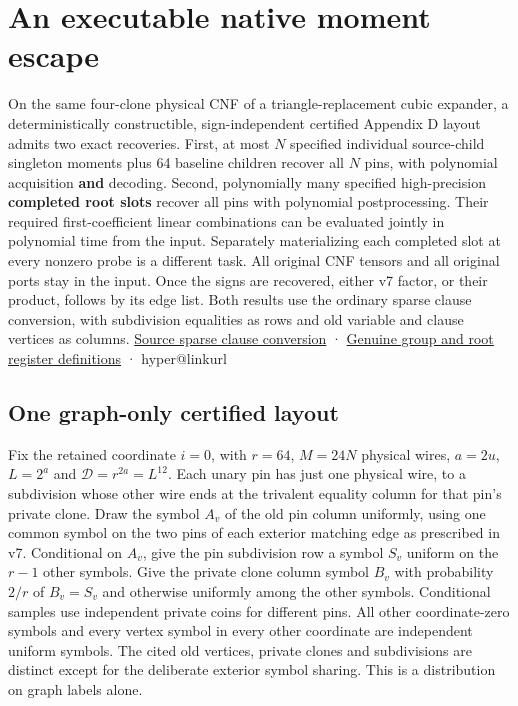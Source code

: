 \documentclass[
  11pt,
]{article}
\makeatletter
\newcommand{\PaperSixCatalogue}[1]{\csname hyper@linkurl\endcsname{#1}{EVIDENCE_CATALOG.md}}
\newcommand{\PaperSixEvidence}[2]{\PaperSixCatalogue{#2}}
\makeatother
\begin{document}
\section{An executable native moment
escape}\label{v9-section-moment-escape}

On the same four-clone physical CNF of a triangle-replacement cubic
expander, a deterministically constructible, sign-independent certified
Appendix D layout admits two exact recoveries. First, at most \(N\)
specified individual source-child singleton moments plus 64 baseline
children recover all \(N\) pins, with polynomial acquisition
\textbf{and} decoding. Second, polynomially many specified
high-precision \textbf{completed root slots} recover all pins with
polynomial postprocessing. Their required first-coefficient linear
combinations can be evaluated jointly in polynomial time from the input.
Separately materializing each completed slot at every nonzero probe is a
different task. All original CNF tensors and all original ports stay in
the input. Once the signs are recovered, either v7 factor, or their
product, follows by its edge list. Both results use the ordinary sparse
clause conversion, with subdivision equalities as rows and old variable
and clause vertices as columns.
\href{https://github.com/openai/math/blob/main/preprints/The-Exponential-Time-Hypothesis-is-False-October-25-2026/build/quantitative-reduction.tex\#L65}{Source
sparse clause conversion} ·
\href{https://github.com/openai/math/blob/main/preprints/The-Exponential-Time-Hypothesis-is-False-October-25-2026/build/quantitative-contraction.tex\#L487}{Genuine
group and root register definitions} ·
\PaperSixEvidence{evidence/research_v7/reviews/hybrid_independent.md}{v7 family}

\subsection{One graph-only certified
layout}\label{v9-one-graph-only-certified-layout}

Fix the retained coordinate \(i=0\), with \(r=64\), \(M=24N\) physical
wires, \(a=2u\), \(L=2^a\) and \(\mathcal D=r^{2a}=L^{12}\). Each unary
pin has just one physical wire, to a subdivision whose other wire ends
at the trivalent equality column for that pin's private clone. Draw the
symbol \(A_v\) of the old pin column uniformly, using one common symbol
on the two pins of each exterior matching edge as prescribed in v7.
Conditional on \(A_v\), give the pin subdivision row a symbol \(S_v\)
uniform on the \(r-1\) other symbols. Give the private clone column
symbol \(B_v\) with probability \(2/r\) of \(B_v=S_v\) and otherwise
uniformly among the other symbols. Conditional samples use independent
private coins for different pins. All other coordinate-zero symbols and
every vertex symbol in every other coordinate are independent uniform
symbols. The cited old vertices, private clones and subdivisions are
distinct except for the deliberate exterior symbol sharing. This is a
distribution on graph labels alone.
\end{document}
